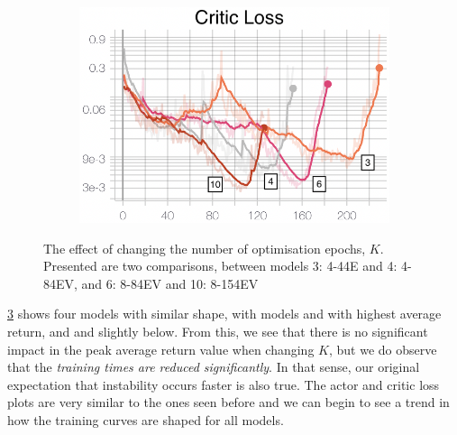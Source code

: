 \begin{figure}[hbt]
\begin{subfigure}[b]{0.32\textwidth}
         \caption{}
         \label{fig:5_training_ppo_noptepochsActorL}
     \end{subfigure}
     \hfill
     \begin{subfigure}[b]{0.32\textwidth}
         \centering
         \includegraphics[width=\textwidth]{figures/5_/Training/ppo_noptepochsCriticL.png}
         \caption{}
         \label{fig:5_training_ppo_CriticL}
     \end{subfigure}
    \captionsetup{justification=centering}
    \caption{The effect of changing the number of optimisation epochs, $K$. Presented are two comparisons, between models 3: 4-44E and 4: 4-84EV, and 6: 8-84EV and 10: 8-154EV}
     \label{fig:5_training_ppo_noptepochs}
\end{figure}
\cref{fig:5_training_ppo_noptepochs} shows four models with similar shape, with models \ten and \six with highest average return, and \three and \four slightly below. From this, we see that there is no significant impact in the peak average return value when changing $K$, but we do observe that the \textit{training times are reduced significantly}. In that sense, our original expectation that instability occurs faster is also true. The actor and critic loss plots are very similar to the ones seen before and we can begin to see a trend in how the training curves are shaped for all models.


